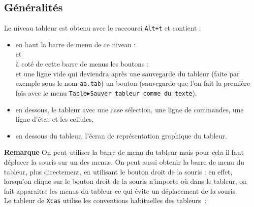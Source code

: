 \documentclass[a4paper,11pt]{article}
\begin{document}
\subsection{G\'en\'eralit\'es}
Le niveau tableur est obtenu avec le raccourci {\tt Alt+t} et contient :
\begin{itemize}
\item en haut la barre de menu  de ce niveau :\\
 et\\
\`a cot\'e de cette barre de menus les boutons :\\
    et
une ligne vide qui deviendra apr\`es une sauvegarde  du tableur (faite par 
exemple sous le nom {\tt aa.tab}) un bouton
 (sauvegarde que l'on fait la premi\`ere fois avec le
menu {\tt Table$\blacktriangleright$Sauver tableur comme du texte}).
\item en dessous, le tableur avec une case s\'election, une ligne de commandes,
une  ligne d'\'etat et les cellules,
\item  en dessous du tableur, l'\'ecran de repr\'esentation graphique du tableur.
\end{itemize}
{\bf Remarque} On peut utiliser la barre de menu du tableur mais pour cela il 
faut d\'eplacer la souris sur un des menus. On peut aussi obtenir la barre de 
menu du tableur, plus directement, en utilisant le bouton droit de la souris : 
en effet, lorsqu'on clique sur le bouton droit de la souris n'importe o\`u dans
le tableur, on fait apparaitre les menus du tableur ce qui \'evite un d\'eplacement de la souris.\\
Le tableur de {\tt Xcas} utilise les conventions habituelles des tableurs~:
\end{document}
